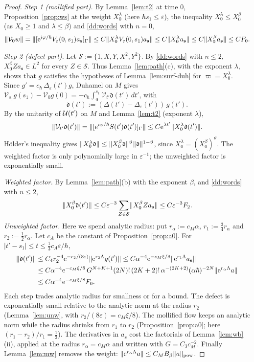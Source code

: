 \begin{proof}
\medskip\noindent\emph{Step 1 (mollified part).} By Lemma~\ref{lem:t2} at time $0$, Proposition~\ref{prop:ws} at the weight $X_0^\lambda$
(here $\hbar s_1\le\varepsilon$), the inequality $X_0^\lambda\le X_0^\beta$ (as $X_0\ge1$ and $\lambda\le\beta$) and \eqref{dd:words} with $n=0$,
\[
\lVert \mathcal V_0w\rVert=\lVert [\mathrm{e}^{i\varphi/\hbar}V_\varepsilon(0,s_1)a_{\mathbf s}]_\Gamma\rVert\le C\lVert X_0^\lambda V_\varepsilon(0,s_1)a_{\mathbf s}\rVert
\le C\lVert X_0^\lambda a_{\mathbf s}\rVert\le C\lVert X_0^\beta a_{\mathbf s}\rVert\le CF_0 .
\]

\medskip\noindent\emph{Step 2 (defect part).} Let $\mathcal S:=\{1,X,Y,X^2,Y^2\}$. By \eqref{dd:words} with $n\le2$,
$X_0^\beta Za_{\mathbf s}\in L^2$ for every $Z\in\mathcal S$. Thus Lemma~\ref{lem:path}(c), with the exponent
$\lambda$, shows that $g$ satisfies the hypotheses of Lemma~\ref{lem:surf-duh} for $\varpi=X_0^\lambda$. Since $g'=c_\hbar\,\Delta_\varepsilon(t')g$,
Duhamel on $M$ gives $\mathcal V_{s_1}g(s_1)-\mathcal V_0g(0)=-c_\hbar\int_0^{s_1}\mathcal V_{t'}\mathfrak d(t')\,dt'$, with
\[
\mathfrak d(t'):=(\Delta(t')-\Delta_\varepsilon(t'))\,g(t').
\]
By the unitarity of $\mathcal{U}(t')$ on $M$ and Lemma~\ref{lem:t2} (exponent $\lambda$),
\[\lVert \mathcal V_{t'}\mathfrak d(t')\rVert=\lVert [\mathrm{e}^{i\varphi/\hbar}S(t')\mathfrak d(t')]_\Gamma\rVert\le C\mathrm{e}^{\lambda t'}\lVert X_0^\lambda \mathfrak d(t')\rVert.\]
H\"older's inequality gives $\lVert X_0^\lambda\mathfrak d\rVert\le\lVert X_0^\beta\mathfrak d\rVert^\vartheta\lVert \mathfrak d\rVert^{1-\vartheta}$, since $X_0^\lambda=(X_0^\beta)^\vartheta$.
The weighted factor is only polynomially large in $\varepsilon^{-1}$; the unweighted factor is exponentially small.

\emph{Weighted factor.} By Lemma~\ref{lem:path}(b) with the exponent $\beta$, and \eqref{dd:words} with $n\le2$,
\[
\lVert X_0^\beta \mathfrak d(t')\rVert\le C\varepsilon^{-3}\sum_{Z\in\mathcal S}\lVert X_0^\beta Za_{\mathbf s}\rVert\le C\varepsilon^{-3}F_2 .
\]
\emph{Unweighted factor.} Here we spend analytic radius: put $r_\alpha:=c_M\alpha$, $r_1:=\tfrac34r_\alpha$ and $r_2:=\tfrac12r_\alpha$.
Let $c_A$ be the constant of Proposition~\ref{prop:a0}. For $|t'-s_1|\le t\le\tfrac13c_A\varepsilon/\hbar$,
\begin{align*}
\lVert \mathfrak d(t')\rVert&\le C_4r_2^{-4}\mathrm{e}^{-r_2/(8\varepsilon)}\lVert \mathrm{e}^{r_2\Lambda}g(t')\rVert
\le C\alpha^{-4}\mathrm{e}^{-c_M\xi/8}\lVert \mathrm{e}^{r_1\Lambda}a_{\mathbf s}\rVert\\
&\le C\alpha^{-4}\mathrm{e}^{-c_M\xi/8}\,G^{N+K+1}(2N)!\,(2K+2)!\,\alpha^{-(2K+2)}(\alpha\hbar)^{-2N}\lVert \mathrm{e}^{r_\alpha\Lambda}a\rVert\\
&\le C\alpha^{-4}\mathrm{e}^{-c_M\xi/8}F_0 .
\end{align*}
Each step trades analytic radius for smallness or for a bound. The defect is exponentially small relative to the analytic norm at the
radius $r_2$ (Lemma~\ref{lem:unw}, with $r_2/(8\varepsilon)=c_M\xi/8$). The mollified flow keeps an analytic norm while the radius
shrinks from $r_1$ to $r_2$ (Proposition~\ref{prop:a0}; here $(r_1-r_2)/r_1=\tfrac13$). The derivatives in $a_{\mathbf s}$ cost the
factorials of Lemma~\ref{lem:wb}(ii), applied at the radius $r_\alpha=c_M\alpha$ and written with $G=C_3c_M^{-2}$. Finally
Lemma~\ref{lem:mw} removes the weight: $\lVert \mathrm{e}^{r_\alpha\Lambda}a\rVert\le C_MB_\beta\lVert a\rVert_{\mathrm{pow}}$.


\end{proof}
